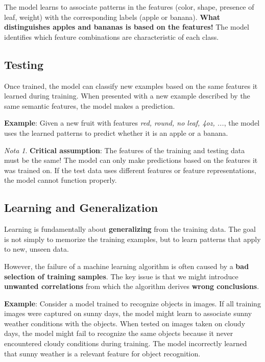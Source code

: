 \documentclass[11pt,a4paper]{article}
\theoremstyle{definition}
\theoremstyle{plain}
\theoremstyle{remark}
\newtheorem*{remark}{Nota}
\begin{document}
The model learns to associate patterns in the features (color, shape, presence of leaf, weight) with the corresponding labels (apple or banana). \textbf{What distinguishes apples and bananas is based on the features!} The model identifies which feature combinations are characteristic of each class.

\subsection{Testing}

Once trained, the model can classify new examples based on the same features it learned during training. When presented with a new example described by the same semantic features, the model makes a prediction.

\textbf{Example}: Given a new fruit with features \textit{red, round, no leaf, 4oz, ...}, the model uses the learned patterns to predict whether it is an apple or a banana.

\begin{remark}
\textbf{Critical assumption}: The features of the training and testing data must be the same! The model can only make predictions based on the features it was trained on. If the test data uses different features or feature representations, the model cannot function properly.
\end{remark}

\subsection{Learning and Generalization}

Learning is fundamentally about \textbf{generalizing} from the training data. The goal is not simply to memorize the training examples, but to learn patterns that apply to new, unseen data.

However, the failure of a machine learning algorithm is often caused by a \textbf{bad selection of training samples}. The key issue is that we might introduce \textbf{unwanted correlations} from which the algorithm derives \textbf{wrong conclusions}.

\textbf{Example}: Consider a model trained to recognize objects in images. If all training images were captured on sunny days, the model might learn to associate sunny weather conditions with the objects. When tested on images taken on cloudy days, the model might fail to recognize the same objects because it never encountered cloudy conditions during training. The model incorrectly learned that sunny weather is a relevant feature for object recognition.
\end{document}
